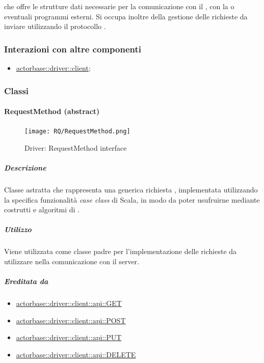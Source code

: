 \documentclass{scalatekids-article}
\begin{document}
 che offre le strutture dati necessarie per la comunicazione con
il , con la  o eventuali programmi esterni. Si occupa
inoltre della gestione delle richieste  da inviare utilizzando il
protocollo .

\subsubsection{Interazioni con altre componenti}
\begin{itemize}
\item \hyperref[sec:actorbase::driver::client]{actorbase::driver::client};
\end{itemize}

\subsubsection{Classi}

\paragraph{RequestMethod (abstract)}
\label{sec:actorbase::driver::client::api::RequestMethod}

\begin{figure}[H]
  \begin{center}
    \texttt{[image: RQ/RequestMethod.png]}
    \caption{Driver: RequestMethod interface}
  \end{center}
\end{figure}

\subparagraph{Descrizione}

Classe astratta che rappresenta una generica richiesta ,
implementata utilizzando la specifica funzionalità \textit{case class} di Scala,
in modo da poter usufruirne mediante costrutti e algoritmi di .

\subparagraph{Utilizzo}

Viene utilizzata come classe padre per l'implementazione delle richieste
 da utilizzare nella comunicazione con il server.

\subparagraph{Ereditata da}

\begin{itemize}
\item \hyperref[sec:actorbase::driver::client::api::GET]{actorbase::driver::client::api::GET}
\item \hyperref[sec:actorbase::driver::client::api::POST]{actorbase::driver::client::api::POST}
\item \hyperref[sec:actorbase::driver::client::api::PUT]{actorbase::driver::client::api::PUT}
\item \hyperref[sec:actorbase::driver::client::api::DELETE]{actorbase::driver::client::api::DELETE}
\end{itemize}
\end{document}
